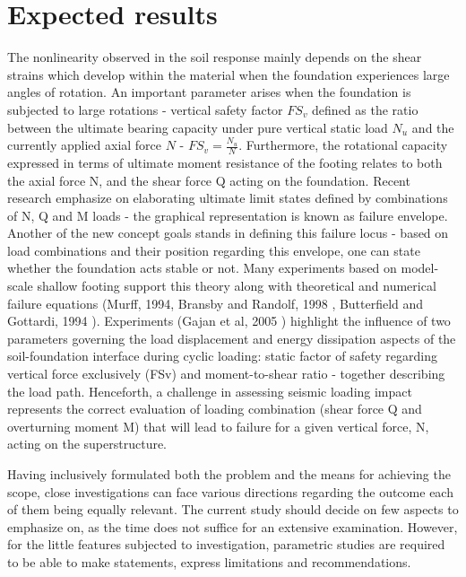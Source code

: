 \documentclass[12pt,a4paper]{report}
\begin{document}
\section{Expected results}
The nonlinearity observed in the soil response mainly depends on the shear strains which develop within the material when the foundation experiences large angles of rotation. An important parameter arises when the foundation is subjected to large rotations - vertical safety factor $FS_v$ defined as the ratio between the ultimate bearing capacity under pure vertical static load $N_u$ and the currently applied axial force $N$ - $FS_v = \frac{N_u}{N}$. Furthermore, the rotational capacity expressed in terms of ultimate moment resistance of the footing relates to both the axial force N, and the shear force Q acting on the foundation. Recent research emphasize on elaborating ultimate limit states defined by combinations of N, Q and M loads - the graphical representation is known as failure envelope. 
Another of the new concept goals stands in defining this failure locus - based on load combinations and their position regarding this envelope, one can state whether the foundation acts stable or not. Many experiments based on model-scale shallow footing support this theory along with theoretical and numerical failure equations (Murff, 1994, Bransby and Randolf, 1998 \cite{bransby1998combined}, Butterfield and Gottardi, 1994 \cite{gottardi1999plastic}). Experiments (Gajan et al, 2005 \cite{gajan2005centrifuge}) highlight the influence of two parameters governing the load displacement and energy dissipation aspects of the soil-foundation interface during cyclic loading: static factor of safety regarding vertical force exclusively (FSv) and moment-to-shear ratio - together describing the load path. Henceforth, a challenge in assessing seismic loading impact represents the correct evaluation of loading combination (shear force Q and overturning moment M) that will lead to failure for a given vertical force, N, acting on the superstructure.



Having inclusively formulated both the problem and the means for achieving the scope, close investigations can face various directions regarding the outcome each of them being equally relevant. The current study should decide on few aspects to emphasize on, as the time does not suffice for an extensive examination. However, for the little features subjected to investigation, parametric studies are required to be able to make statements, express limitations and recommendations.
\end{document}
